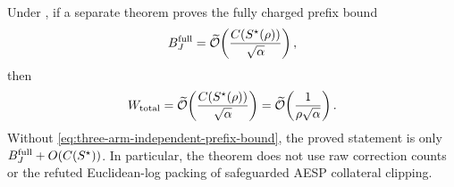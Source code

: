 \begin{corollary}
\label{cor:three-arm-composite-product-conditional}
Under , if a separate theorem
proves the fully charged prefix bound
\begin{equation}
 B_J^{\rm full}=\widetilde{\mathcal{O}}\!\left(
   \frac{C(S^\star(\rho))}{\sqrt\alpha}
 \right),
 \label{eq:three-arm-independent-prefix-bound}
\end{equation}
then
\begin{equation}
 W_{\rm total}
 =\widetilde{\mathcal{O}}\!\left(
   \frac{C(S^\star(\rho))}{\sqrt\alpha}
 \right)
 =\widetilde{\mathcal{O}}\!\left(\frac1{\rho\sqrt\alpha}\right).
 \label{eq:three-arm-conditional-product-work}
\end{equation}
Without \cref{eq:three-arm-independent-prefix-bound}, the proved statement is
only $B_J^{\rm full}+O(C(S^\star))$. In particular, the theorem does not use
raw correction counts or the refuted Euclidean-log packing of safeguarded
AESP collateral clipping.
\end{corollary}
